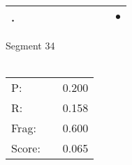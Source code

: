 \documentclass[landscape]{article}
\newcommand{\ssp}{\hspace{2pt}}
\newcommand{\mex}{\cellcolor{g}$\bullet$}
\begin{document}
\begin{tabular}{|l|p{10pt}|p{10pt}|p{10pt}|p{10pt}|p{10pt}|p{10pt}|p{10pt}|p{10pt}|p{10pt}|}
\hline
\ssp \cellcolor{ref8}. \ssp&\hspace{2pt}&\hspace{2pt}&\hspace{2pt}&\hspace{2pt}&\hspace{2pt}&\hspace{2pt}&\hspace{2pt}&\hspace{2pt}&\hspace{2pt}\mex\\
\hline
\end{tabular}

\vspace{6pt}
\noindent Segment 34\\\\
\noindent\begin{tabular}{lm{12pt}r}
\hline
P:&&0.200\\
R:&&0.158\\
Frag:&&0.600\\
Score:&&0.065\\
\end{tabular}

\newpage
\end{document}
